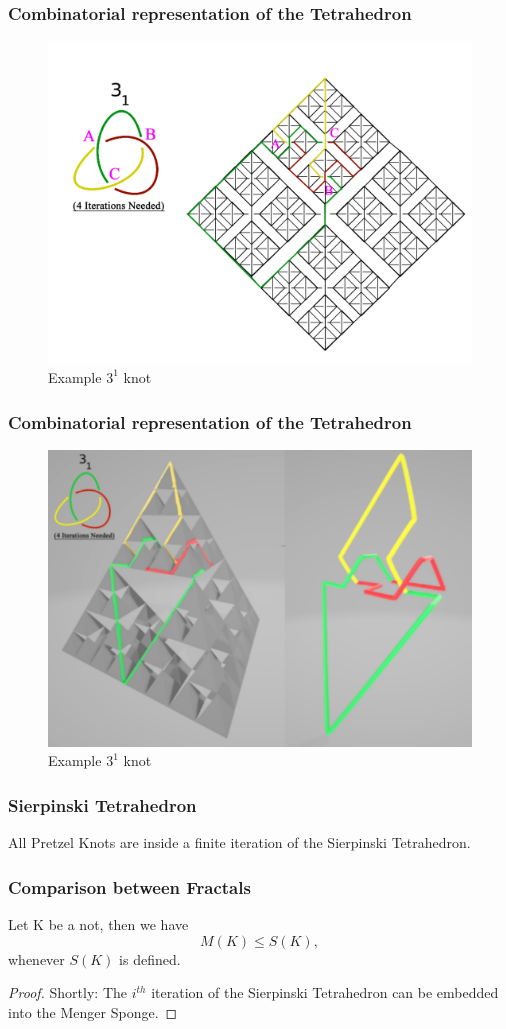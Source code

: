 \begin{frame}
	\frametitle{Combinatorial representation of the Tetrahedron} %
	\begin{figure}[h]
		\centering
		\includegraphics[width=0.5\linewidth]{images/CombRep2}
		\caption{Example $3^1$ knot \cite{broden2024knotsinsidefractals}}
		\label{fig:enter-label}
	\end{figure}
\end{frame}

\begin{frame}
	\frametitle{Combinatorial representation of the Tetrahedron} %
	\begin{figure}[h]
		\centering
		\includegraphics[width=0.5\linewidth]{images/CombRep3}
		\caption{Example $3^1$ knot \cite{broden2024knotsinsidefractals}}
		\label{fig:enter-label}
	\end{figure}
\end{frame}

\begin{frame}
	\frametitle{Sierpinski Tetrahedron} %
	\begin{theorem}
		All Pretzel Knots are inside a finite iteration of the Sierpinski Tetrahedron. \cite{broden2024knotsinsidefractals}
	\end{theorem}
\end{frame}

\begin{frame}
	\frametitle{Comparison between Fractals} %
	\begin{theorem}
		Let K be a not, then we have
		$$M(K)\leq S(K),$$
		whenever $S(K)$ is defined. \cite{broden2024knotsinsidefractals}
	\end{theorem}
	
	\begin{proof}
		Shortly: The $i^{th}$ iteration of the Sierpinski Tetrahedron can be embedded into the Menger Sponge.
	\end{proof}
\end{frame}

